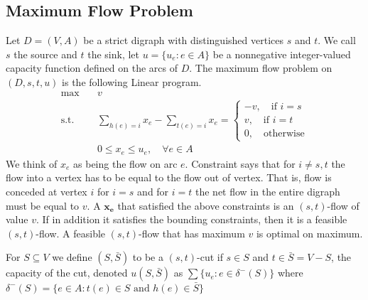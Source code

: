         \subsection{Maximum Flow Problem}
            Let $D=(V, A)$ be a strict digraph with distinguished vertices $s$ and $t$. We call $s$ the source and $t$ the sink, let $u=\{u_e: e\in A\}$ be a nonnegative integer-valued capacity function defined on the arcs of $D$. The maximum flow problem on $(D, s, t, u)$ is the following Linear program.
            \begin{align*}
                \max \quad & v\\
                \text{s.t.} \quad & \sum_{h(e)=i}x_e - \sum_{t(e) = i} x_e = \begin{cases}
                    -v, \quad \text{if } i = s\\
                    v, \quad \text{if } i = t \\
                    0, \quad \text{otherwise}
                \end{cases}\\
                & 0\le x_e \le u_e, \quad \forall e\in A
            \end{align*}
            We think of $x_e$ as being the flow on arc $e$. Constraint says that for $i \neq s, t$ the flow into a vertex has to be equal to the flow out of vertex. That is, flow is conceded at vertex $i$ for $i=s$ and for $i=t$ the net flow in the entire digraph must be equal to $v$. A $\mathbf{x_e}$ that satisfied the above constraints is an $(s,t)$-flow of value $v$. If in addition it satisfies the bounding constraints, then it is a feasible $(s,t)$-flow. A feasible $(s,t)$-flow that has maximum $v$ is optimal on maximum.

            \begin{theorem}
                For $S \subseteq V$ we define $(S, \bar{S})$ to be a $(s, t)$-cut if $s\in S$ and $t\in \bar{S}=V-S$, the capacity of the cut, denoted $u(S, \bar{S})$ as $\sum \{u_e: e\in \delta^-(S)\}$ where $\delta^-(S) = \{e\in A: t(e) \in S \text{ and } h(e) \in \bar{S}\}$
            \end{theorem}

